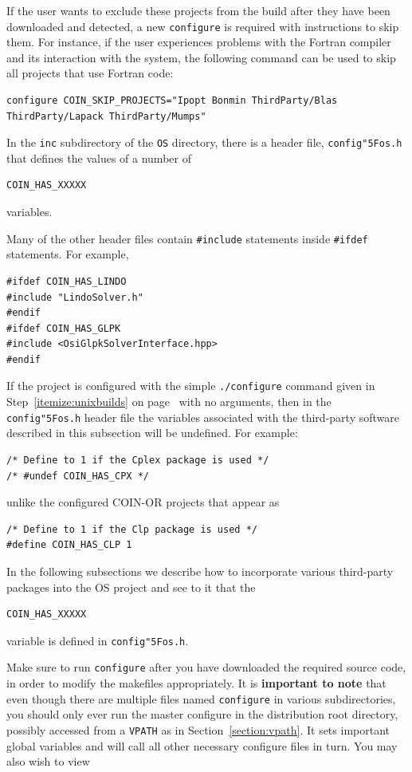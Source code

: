 \documentclass[11pt]{article}
\renewcommand{\_}{{\char"5F}}
\renewcommand{\{}{{\char"7B}}
\renewcommand{\}}{{\char"7D}}
\renewcommand{\^}{{\char"0D}}
\renewcommand{\'}{{\char"0D}}
\begin{document}
If the user wants to exclude these projects from the build after they have been downloaded and detected, 
a new {\tt configure} is required with instructions to skip them. For instance, if the user experiences problems 
with the Fortran compiler and its interaction with the system, the following command can be used 
to skip all projects that use Fortran code:

\begin{verbatim}
configure COIN_SKIP_PROJECTS="Ipopt Bonmin ThirdParty/Blas ThirdParty/Lapack ThirdParty/Mumps"
\end{verbatim}
\index{COIN_SKIP_PROJECTS@{\tt COIN\_SKIP\_PROJECTS}}

In the {\tt inc} subdirectory of the {\tt OS}  directory, there is a header file, {\tt config\_os.h} that defines 
the values of a number of
\begin{verbatim}
COIN_HAS_XXXXX
\end{verbatim}
variables. 

Many of the other header files contain {\tt \#include} statements inside {\tt  \#ifdef}  statements. For example,
\begin{verbatim}
#ifdef COIN_HAS_LINDO
#include "LindoSolver.h"
#endif
#ifdef COIN_HAS_GLPK
#include <OsiGlpkSolverInterface.hpp>
#endif
\end{verbatim}

If the project is configured with the simple {\tt ./configure} command given in Step~\ref{itemize:unixbuilds} 
on page~\pageref{itemize:unixbuilds} with no arguments, then in the {\tt config\_os.h} header file the variables 
associated with the third-party software described in this subsection will be undefined. For example:
\begin{verbatim}
/* Define to 1 if the Cplex package is used */
/* #undef COIN_HAS_CPX */
\end{verbatim}
unlike the configured COIN-OR projects that appear as
\begin{verbatim}
/* Define to 1 if the Clp package is used */
#define COIN_HAS_CLP 1
\end{verbatim}
In the following subsections we  describe how to incorporate various  third-party packages into the OS project 
and see to it that the
\begin{verbatim}
COIN_HAS_XXXXX
\end{verbatim}
variable is defined in  {\tt config\_os.h}. 

\medskip
Make sure to run {\tt configure} after you have downloaded the required
source code, in order to modify the makefiles appropriately. It is {\bf important to note} that even though there are
multiple files named {\tt configure} in various subdirectories, you should only ever run the master configure in the 
distribution root directory, possibly accessed from a {\tt VPATH} as in Section~\ref{section:vpath}.
It sets important global variables and will call all other necessary configure files in turn.
You may also wish to view
\end{document}
